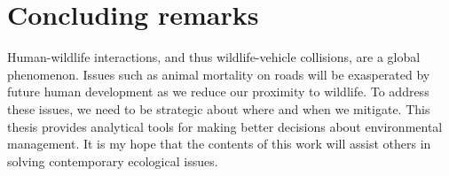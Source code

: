 \section{Concluding remarks}

Human-wildlife interactions, and thus wildlife-vehicle collisions, are a global phenomenon. Issues such as animal mortality on roads will be exasperated by future human development as we reduce our proximity to wildlife. To address these issues, we need to be strategic about where and when we mitigate. This thesis provides analytical tools for making better decisions about environmental management. It is my hope that the contents of this work will assist others in solving contemporary ecological issues.